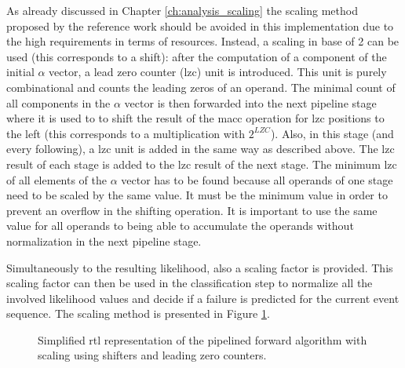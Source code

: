 \documentclass[mscthesis]{usiinfthesis}
\begin{document}
As already discussed in Chapter \ref{ch:analysis_scaling} the scaling method
proposed by the reference work should be avoided in this implementation due to
the high requirements in terms of resources. Instead, a scaling in base of
2 can be used (this corresponds to a shift): after the computation of
a component of the initial $\alpha$ vector, a lead zero counter (\gls{lzc})
unit is introduced. This unit is purely combinational and counts the leading
zeros of an operand. The minimal count of all components in the $\alpha$ vector
is then forwarded into the next pipeline stage where it is used to to shift the
result of the \gls{macc} operation for \gls{lzc} positions to the left (this
corresponds to a multiplication with $2^{LZC}$). Also, in this stage (and every
following), a \gls{lzc} unit is added in the same way as described above. The
\gls{lzc} result of each stage is added to the \gls{lzc} result of the next
stage. The minimum \gls{lzc} of all elements of the $\alpha$ vector has to be
found because all operands of one stage need to be scaled by the same value. It
must be the minimum value in order to prevent an overflow in the shifting
operation. It is important to use the same value for all operands to being able
to accumulate the operands without normalization in the next pipeline stage.

Simultaneously to the resulting likelihood, also a scaling factor is provided.
This scaling factor can then be used in the classification step to normalize
all the involved likelihood values and decide if a failure is predicted for the
current event sequence. The scaling method is presented in Figure
\ref{fig:arch_pipe_scale}.

\begin{figure}
    \centering
    
    \caption{Simplified \acrshort{rtl} representation of the pipelined forward
        algorithm with scaling using shifters and leading zero counters.}
    \label{fig:arch_pipe_scale}
\end{figure}
\end{document}

